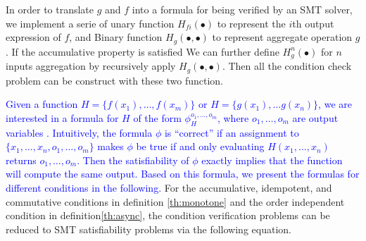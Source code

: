In order to translate $g$ and $f$ into a formula for being verified by an SMT solver, we implement a serie of unary function $H_{fi}(\bullet)$  to represent the $i$th output expression of $f$, and Binary function $H_g(\bullet,\bullet)$ to represent aggregate operation $g$. If the accumulative property is satisfied
We can further define $H^n_g(\bullet)$ for $n$ inputs aggregation by recursively apply $H_g(\bullet,\bullet)$.
Then all the condition check problem can be construct with these two function.

\textcolor{blue}{ Given a function $H=\{f(x_1),\ldots,f(x_m)\}$ or $H=\{g(x_1),...g(x_n)\}$, we are interested in a formula for $H$ of the form $\phi_H^{o_1,\ldots,o_m}$, where $o_1,\ldots,o_m$ are output variables \cite{Liu:2014:ADP:2670979.2670980}. Intuitively, the formula $\phi$ is ``correct'' if an assignment to $\{x_1,\ldots,x_n,o_1,\ldots,o_m\}$ makes $\phi$ be true if and only evaluating $H(x_1,\ldots,x_n)$ returns $o_1,\ldots,o_m$. Then the satisfiability of $\phi$ exactly implies that the function will compute the same output. Based on this formula, we present the formulas for different conditions in the following.
}
For the accumulative, idempotent, and commutative conditions in definition \ref{th:monotone} and the order independent condition in definition\ref{th:async}, the condition verification problems can be reduced to SMT satisfiability problems via the following equation.

